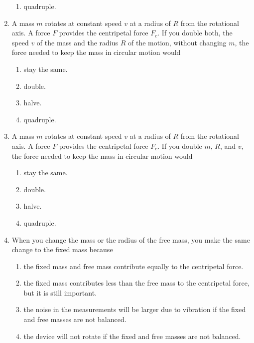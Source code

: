 \begin{enumerate}
\begin{enumerate}
  \item quadruple.
  \end{enumerate}
\item A mass $m$ rotates at constant speed $v$ at a radius of $R$ from the rotational axis. A force $F$ provides the centripetal force $F_{c}$. If you double both, the speed $v$ of the mass and the radius $R$ of the motion, without changing $m$, the force needed to keep the mass in circular motion would
  \begin{enumerate}
  \item stay the same.
  \item double.
  \item halve.
  \item quadruple.
  \end{enumerate}
\item A mass $m$ rotates at constant speed $v$ at a radius of $R$ from the rotational axis. A force $F$ provides the centripetal force $F_{c}$. If you double $m$, $R$, and $v$, the force needed to keep the mass in circular motion would
  \begin{enumerate}
  \item stay the same.
  \item double.
  \item halve.
  \item quadruple.
  \end{enumerate}
\item When you change the mass or the radius of the free mass, you make the same change to the fixed mass because
  \begin{enumerate}
  \item the fixed mass and free mass contribute equally to the centripetal force.
  \item the fixed mass contributes less than the free mass to the centripetal force, but it is still important.
  \item the noise in the measurements will be larger due to vibration if the fixed and free masses are not balanced.
  \item the device will not rotate if the fixed and free masses are not balanced.
  \end{enumerate}
\end{enumerate}










